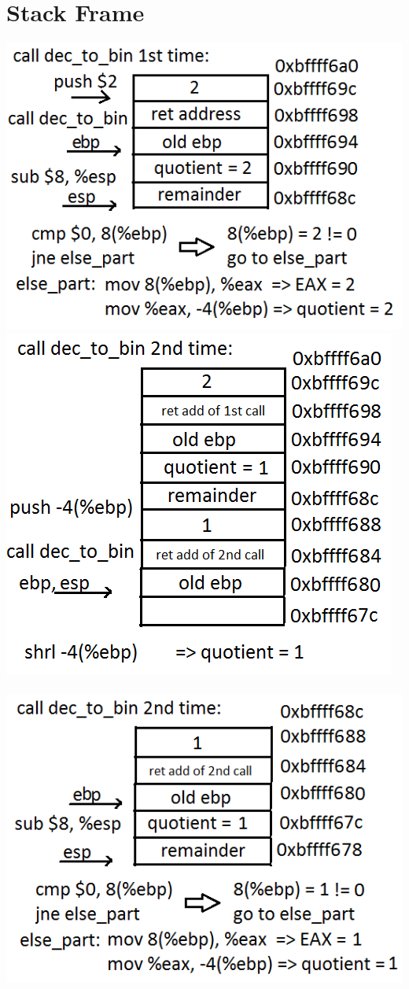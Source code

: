 \documentclass{article}
\begin{document}
\clearpage\section{Stack Frame}
\includegraphics[scale=0.5]{stack1.png}
\includegraphics[scale=0.5]{stack2.png}\\ \\ 
\includegraphics[scale=0.5]{stack3.png}
\end{document}
